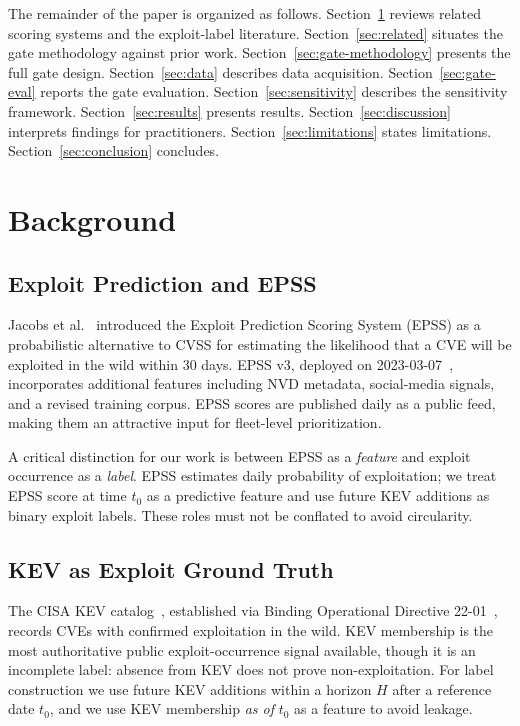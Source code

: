 \documentclass[conference]{IEEEtran}
\begin{document}
The remainder of the paper is organized as follows.
Section~\ref{sec:background} reviews related scoring systems and the
exploit-label literature. Section~\ref{sec:related} situates the gate
methodology against prior work. Section~\ref{sec:gate-methodology} presents
the full gate design. Section~\ref{sec:data} describes data acquisition.
Section~\ref{sec:gate-eval} reports the gate evaluation.
Section~\ref{sec:sensitivity} describes the sensitivity framework.
Section~\ref{sec:results} presents results. Section~\ref{sec:discussion}
interprets findings for practitioners. Section~\ref{sec:limitations} states
limitations. Section~\ref{sec:conclusion} concludes.

\section{Background}
\label{sec:background}

\subsection{Exploit Prediction and EPSS}

Jacobs et al.~\cite{jacobs2021epss} introduced the Exploit Prediction Scoring
System (EPSS) as a probabilistic alternative to CVSS for estimating the
likelihood that a CVE will be exploited in the wild within 30 days. EPSS v3,
deployed on 2023-03-07~\cite{jacobs2023epss}, incorporates additional features
including NVD metadata, social-media signals, and a revised training corpus.
EPSS scores are published daily as a public feed, making them an attractive
input for fleet-level prioritization.

A critical distinction for our work is between EPSS as a \emph{feature} and
exploit occurrence as a \emph{label}. EPSS estimates daily probability of
exploitation; we treat EPSS score at time $t_0$ as a predictive feature and
use future KEV additions as binary exploit labels. These roles must not be
conflated to avoid circularity.

\subsection{KEV as Exploit Ground Truth}

The CISA KEV catalog~\cite{cisa_kev}, established via Binding Operational
Directive 22-01~\cite{cisa_bod2201}, records CVEs with confirmed exploitation
in the wild. KEV membership is the most authoritative public exploit-occurrence
signal available, though it is an incomplete label: absence from KEV does not
prove non-exploitation. For label construction we use future KEV additions
within a horizon $H$ after a reference date $t_0$, and we use KEV membership
\emph{as of} $t_0$ as a feature to avoid leakage.
\end{document}
